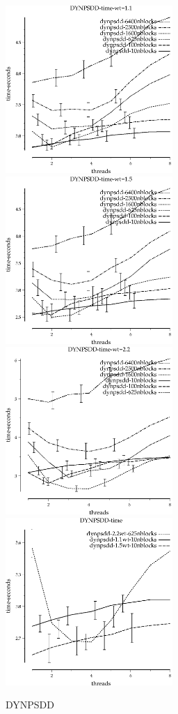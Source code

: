 \documentclass{article}
\begin{document}
\begin{figure}
\begin{center}
\includegraphics[width=2.5in]{DYNPSDD-time-wt=1.1.eps}
\includegraphics[width=2.5in]{DYNPSDD-time-wt=1.5.eps}
\includegraphics[width=2.5in]{DYNPSDD-time-wt=2.2.eps}
\includegraphics[width=2.5in]{DYNPSDD-time}
\end{center}
\caption{DYNPSDD}
\end{figure}
\end{document}
